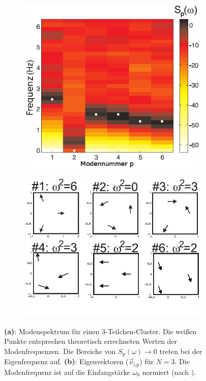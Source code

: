 \documentclass[numbers=noenddot,a4paper,notitlepage,twoside,BCOR15mm]{scrbook}
\newcommand{\ix}[1]{_\text{#1}}
\newcommand{\fett}[1]{\textbf{#1}}
\begin{document}
						\begin{figure}
							\centering
							\begin{subfigure}[b]{0.48\textwidth}
								\centering
								\includegraphics[width=\textwidth,height=0.3\textheight]{figs/modenvenergie3teilchenmelzer.png}
								\caption{}
								\label{img:spektrum}
							\end{subfigure}
							\begin{subfigure}[b]{0.48\textwidth}
								\centering
								\includegraphics[width=\textwidth,height=0.3\textheight]{figs/modenvektoren3teilchenmelzer.png}
								\caption{}
								\label{img:moden}
							\end{subfigure}
							\caption{\fett{(a)}: Modenspektrum für einen 3-Teilchen-Cluster. Die weißen Punkte entsprechen theoretisch errechneten Werten der Modenfrequenzen. Die Bereiche von $S\ix{p}\left(\omega\right)\rightarrow0$ treten bei der Eigenfrequenz auf. \fett{(b)}: Eigenvektoren ($\vec{\nu}\ix{i,p}$) für $N=3$. Die Modenfrequenz ist auf die Einfangstärke $\omega\ix{0}$ normiert (nach \cite{Melzer12}).}
						\end{figure}
\end{document}
